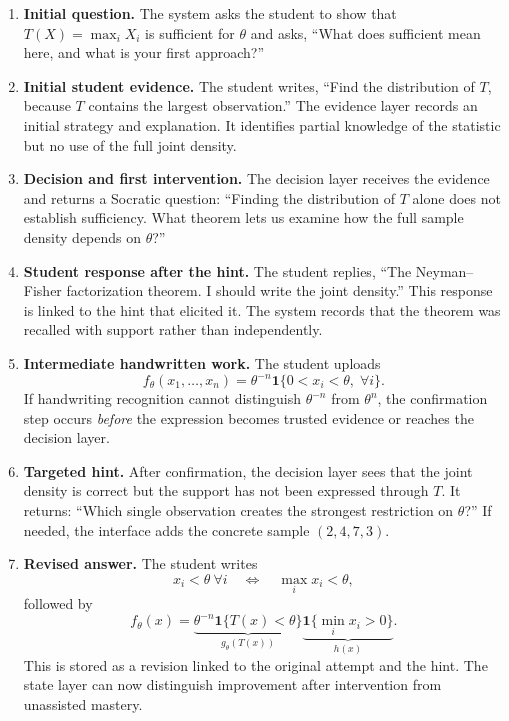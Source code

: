 \documentclass[11pt]{article}
\begin{document}
\begin{enumerate}
    \item \textbf{Initial question.} The system asks the student to show that $T(X)=\max_i X_i$ is sufficient for $\theta$ and asks, ``What does sufficient mean here, and what is your first approach?''

    \item \textbf{Initial student evidence.} The student writes, ``Find the distribution of $T$, because $T$ contains the largest observation.'' The evidence layer records an initial strategy and explanation. It identifies partial knowledge of the statistic but no use of the full joint density.

    \item \textbf{Decision and first intervention.} The decision layer receives the evidence and returns a Socratic question: ``Finding the distribution of $T$ alone does not establish sufficiency. What theorem lets us examine how the full sample density depends on $\theta$?''

    \item \textbf{Student response after the hint.} The student replies, ``The Neyman--Fisher factorization theorem. I should write the joint density.'' This response is linked to the hint that elicited it. The system records that the theorem was recalled with support rather than independently.

    \item \textbf{Intermediate handwritten work.} The student uploads
    \[
    f_\theta(x_1,\ldots,x_n)=\theta^{-n}
    \mathbf{1}\{0<x_i<\theta,\;\forall i\}.
    \]
    If handwriting recognition cannot distinguish $\theta^{-n}$ from $\theta^n$, the confirmation step occurs \emph{before} the expression becomes trusted evidence or reaches the decision layer.

    \item \textbf{Targeted hint.} After confirmation, the decision layer sees that the joint density is correct but the support has not been expressed through $T$. It returns: ``Which single observation creates the strongest restriction on $\theta$?'' If needed, the interface adds the concrete sample $(2,4,7,3)$.

    \item \textbf{Revised answer.} The student writes
    \[
    x_i<\theta\ \forall i
    \quad\Longleftrightarrow\quad
    \max_i x_i<\theta,
    \]
    followed by
    \[
    f_\theta(x)=
    \underbrace{\theta^{-n}\mathbf{1}\{T(x)<\theta\}}_{g_\theta(T(x))}
    \underbrace{\mathbf{1}\{\min_i x_i>0\}}_{h(x)}.
    \]
    This is stored as a revision linked to the original attempt and the hint. The state layer can now distinguish improvement after intervention from unassisted mastery.


\end{enumerate}
\end{document}

